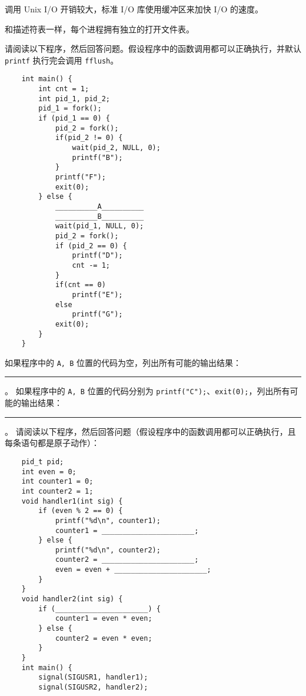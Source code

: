 \begin{problems}
\begin{choices}
            \item 调用 Unix I/O 开销较大，标准 I/O 库使用缓冲区来加快 I/O 的速度。
            \item 和描述符表一样，每个进程拥有独立的打开文件表。
        \end{choices}
         请阅读以下程序，然后回答问题。假设程序中的函数调用都可以正确执行，并默认 \verb|printf| 执行完会调用 \verb|fflush|。
        \begin{verbatim}
    int main() {
        int cnt = 1;
        int pid_1, pid_2;
        pid_1 = fork();
        if (pid_1 == 0) {
            pid_2 = fork();
            if(pid_2 != 0) {
                wait(pid_2, NULL, 0);
                printf("B");
            }
            printf("F");
            exit(0);
        } else {
            __________A__________
            __________B__________
            wait(pid_1, NULL, 0);
            pid_2 = fork();
            if (pid_2 == 0) {
                printf("D");
                cnt -= 1;
            }
            if(cnt == 0)
                printf("E");
            else
                printf("G");
            exit(0);
        }
    }
        \end{verbatim}
        \qn 如果程序中的 \verb|A, B| 位置的代码为空，列出所有可能的输出结果：\rule{3cm}{0.25mm}。
        \qn 如果程序中的 \verb|A, B| 位置的代码分别为 \verb|printf("C");|、\verb|exit(0);|，列出所有可能的输出结果：\rule{6cm}{0.25mm}。
         请阅读以下程序，然后回答问题（假设程序中的函数调用都可以正确执行，且每条语句都是原子动作）：
        \begin{verbatim}
    pid_t pid;
    int even = 0;
    int counter1 = 0;
    int counter2 = 1;
    void handler1(int sig) {
        if (even % 2 == 0) {
            printf("%d\n", counter1);
            counter1 = ______________________;
        } else {
            printf("%d\n", counter2);
            counter2 = ______________________;
            even = even + ______________________;
        }
    }
    void handler2(int sig) {
        if (______________________) {
            counter1 = even * even;
        } else {
            counter2 = even * even;
        }
    }
    int main() {
        signal(SIGUSR1, handler1);
        signal(SIGUSR2, handler2);


\end{verbatim}
\end{problems}

